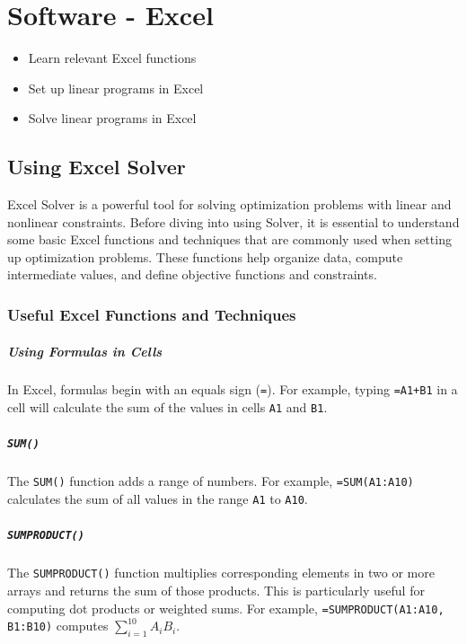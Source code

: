 \chapter{Software - Excel}

\begin{outcome}
\begin{itemize}
\item Learn relevant Excel functions
\item Set up linear programs in Excel
\item Solve linear programs in Excel
\end{itemize}
\end{outcome}

\section{Using Excel Solver}
\label{sec:excel-solver}

Excel Solver is a powerful tool for solving optimization problems with linear and nonlinear constraints. Before diving into using Solver, it is essential to understand some basic Excel functions and techniques that are commonly used when setting up optimization problems. These functions help organize data, compute intermediate values, and define objective functions and constraints.

\subsection{Useful Excel Functions and Techniques}

\paragraph{Using Formulas in Cells}
In Excel, formulas begin with an equals sign (\texttt{=}). For example, typing \texttt{=A1+B1} in a cell will calculate the sum of the values in cells \texttt{A1} and \texttt{B1}.

\paragraph{\texttt{SUM()}}
The \texttt{SUM()} function adds a range of numbers. For example, \texttt{=SUM(A1:A10)} calculates the sum of all values in the range \texttt{A1} to \texttt{A10}.

\paragraph{\texttt{SUMPRODUCT()}}
The \texttt{SUMPRODUCT()} function multiplies corresponding elements in two or more arrays and returns the sum of those products. This is particularly useful for computing dot products or weighted sums. For example, \texttt{=SUMPRODUCT(A1:A10, B1:B10)} computes \( \sum_{i=1}^{10} A_i B_i \).

